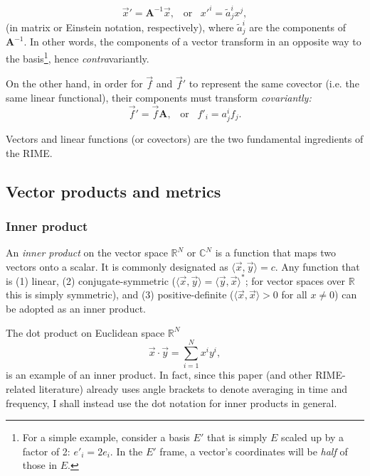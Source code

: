 \documentclass[]{aa}
\begin{document}
\[
  \vec x' = \mathbf{A}^{-1} \vec x,\;\;\;\mbox{or}\;\;\;x'^i = \tilde a^i_j x^j,
\]
(in matrix or Einstein notation, respectively), where $\tilde a^i_j$ are the components of $\mathbf{A}^{-1}.$ In other words, the components of a vector transform in an opposite way to the basis\footnote{For a simple example, consider a basis $E'$ that is simply $E$ scaled up by a factor of 2: $e'_i = 2e_i$. In the $E'$ frame, a vector's coordinates will be {\em half} of those in $E$.}, hence \emph{contra\/}variantly.

On the other hand, in order for $\vec f$ and $\vec f'$ to represent the same covector (i.e. the same linear functional), their components must transform \emph{covariantly:}
\[
  \vec f' = \vec f \mathbf{A},\;\;\;\mbox{or}\;\;\;f'_i = a^i_j f_j.
\]

Vectors and linear functions (or covectors) are the two fundamental ingredients of the RIME.

\subsection{Vector products and metrics}

\subsubsection{Inner product}
\label{sec:inner-prod}

\newcommand{\inprod}[2]{\langle #1,#2 \rangle}

An \emph{inner product} on the vector space $\mathbb{R}^N$ or $\mathbb{C}^N$ is a function that maps two vectors onto a scalar. It is commonly designated as $\inprod{\vec x}{\vec y}=c$. Any function that is (1) linear, (2) conjugate-symmetric ($\inprod{\vec x}{\vec y}=\inprod{\vec y}{\vec x}^*$; for vector spaces over $\mathbb{R}$ this is simply symmetric), and (3) positive-definite ($\inprod{\vec x}{\vec x}>0$ for all $x\ne0$) can be adopted as an inner product. 

The dot product on Euclidean space $\mathbb{R}^N$ \[ \vec x\cdot \vec y = \sum_{i=1}^{N}x^iy^i, \] is an example of an inner product. In fact, since this paper (and other RIME-related literature) already uses angle brackets to denote averaging in time and frequency, I shall instead use the dot notation for inner products in general.
\end{document}
